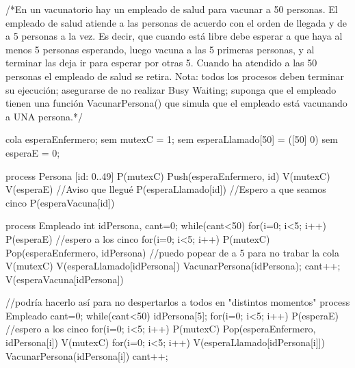 /*En un vacunatorio hay un empleado de salud para vacunar a 50 personas. El empleado
de salud atiende a las personas de acuerdo con el orden de llegada y de a 5 personas a la
vez. Es decir, que cuando está libre debe esperar a que haya al menos 5 personas
esperando, luego vacuna a las 5 primeras personas, y al terminar las deja ir para esperar
por otras 5. Cuando ha atendido a las 50 personas el empleado de salud se retira.
    Nota: todos los procesos deben terminar su ejecución; asegurarse de no realizar Busy Waiting;
    suponga que el empleado tienen una función VacunarPersona() que simula que el empleado
    está vacunando a UNA persona.*/

cola esperaEnfermero;
sem mutexC = 1;
sem esperaLlamado[50] = ([50] 0)
sem esperaE = 0;

process Persona [id: 0..49]
{
    P(mutexC)
    Push(esperaEnfermero, id)
    V(mutexC)
    V(esperaE) //Aviso que llegué
    P(esperaLlamado[id]) //Espero a que seamos cinco
    P(esperaVacuna[id])
}

process Empleado
{
    int idPersona, cant=0;
    while(cant<50)
    {
        for(i=0; i<5; i++) P(esperaE) //espero a los cinco
        for(i=0; i<5; i++)
        {
            P(mutexC)
            Pop(esperaEnfermero, idPersona) //puedo popear de a 5 para no trabar la cola
            V(mutexC)
            V(esperaLlamado[idPersona])
            VacunarPersona(idPersona);
            cant++;
            V(esperaVacuna[idPersona])
        }
    }
}


//podría hacerlo así para no despertarlos a todos en "distintos momentos"
process Empleado
{
    cant=0;
    while(cant<50)
    {
        idPersona[5];
        for(i=0; i<5; i++) P(esperaE) //espero a los cinco
        for(i=0; i<5; i++)
        {
            P(mutexC)
            Pop(esperaEnfermero, idPersona[i])
            V(mutexC)
        }
        for(i=0; i<5; i++){
            V(esperaLlamado[idPersona[i]])
            VacunarPersona(idPersona[i])
            cant++;
        }
    }
}